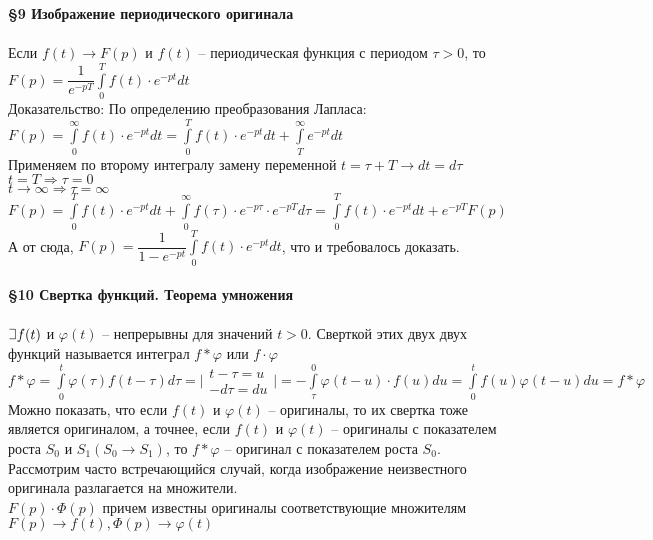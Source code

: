 \documentclass{article}
\numberwithin{equation}{section}
\def\letus{%
    \mathord{\setbox0=\hbox{$\exists$}%
             \hbox{\kern 0.125\wd0%
                   \vbox to \ht0{%
                      \hrule width 0.75\wd0%
                      \vfill%
                      \hrule width 0.75\wd0}%
                   \vrule height \ht0%
                   \kern 0.125\wd0}%
           }%
}
\begin{document}
\\\\
\textbf{\large{\S9 Изображение периодического оригинала}}
\\\\
Если $f(t)\rightarrow F(p)$ и $f(t)$ -- периодическая функция с периодом $\tau>0$, то $F(p)=\dfrac{1}{e^{-pT}}\int\limits_0^Tf(t)\cdot e^{-pt}dt$\\
Доказательство: По определению преобразования Лапласа:\\
$F(p)=\int\limits_0^\infty f(t)\cdot e^{-pt}dt=\int\limits_0^Tf(t)\cdot e^{-pt}dt+\int\limits_T^\infty e^{-pt}dt$\\
Применяем по второму интегралу замену переменной $t=\tau+T\rightarrow dt=d\tau$\\
$t=T\Rightarrow\tau=0$\\
$t\rightarrow\infty\Rightarrow\tau=\infty$\\
$F(p)=\int\limits_0^Tf(t)\cdot e^{-pt}dt+\int\limits_0^\infty f(\tau)\cdot e^{-p\tau}\cdot e^{-pT}d\tau=\int\limits_0^Tf(t)\cdot e^{-pt}dt+e^{-pT}F(p)$\\
А от сюда, $F(p)=\dfrac{1}{1-e^{-pt}}\int\limits_0^Tf(t)\cdot e^{-pt}dt$, что и требовалось доказать.
\\\\
\textbf{\large{\S10 Свертка функций. Теорема умножения}}
\\\\
$\letus f(t)$ и $\varphi(t)$ -- непрерывны для значений $t>0$. Сверткой этих двух двух функций называется интеграл $f*\varphi$ или $f\cdot\varphi$\\
$f*\varphi=\int\limits_0^t\varphi(\tau)f(t-\tau)d\tau=\Big|\begin{matrix}
t-\tau=u\\
-d\tau=du
\end{matrix}\Big|=-\int\limits_\tau^0\varphi(t-u)\cdot f(u)du=\int\limits_0^tf(u)\varphi(t-u)du=f*\varphi$\\
Можно показать, что если $f(t)$ и $\varphi(t)$ -- оригиналы, то их свертка тоже является оригиналом, а точнее, если $f(t)$ и $\varphi(t)$ -- оригиналы с показателем роста $S_0$ и $S_1(S_0\rightarrow S_1)$, то $f*\varphi$ -- оригинал с показателем роста $S_0$.\\
Рассмотрим часто встречающийся случай, когда изображение неизвестного оригинала разлагается на множители.\\
$F(p)\cdot\varPhi(p)$ причем известны оригиналы соответствующие множителям $F(p)\rightarrow f(t), \varPhi(p)\rightarrow\varphi(t)$\\
\end{document}
